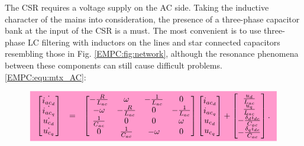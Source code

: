     The CSR requires a voltage supply on the AC side. Taking the inductive character of the mains into consideration, the presence of a three-phase capacitor bank at the input of the CSR is a must. The most convenient is to use three-phase LC filtering with inductors on the lines and star connected capacitors resembling those in Fig. \ref{EMPC:fig:network}, although the resonance phenomena between these components can still cause difficult problems.\\
     \ref{EMPC:equ:mtx_AC}:

    \begin{equation}
    \hlcmath{PT}{
        \begin{array}{rcl}
            \begin{bmatrix}
                \dot{i_{ac_d}}\\
                \dot{i_{ac_q}}\\
                \dot{u_{c_d}}\\
                \dot{u_{c_q}}
            \end{bmatrix}&=&
            \begin{bmatrix}
                -\frac{R}{L_{ac}}   &\omega &-\frac{1}{L_{ac}}  &0\\
                -\omega   &-\frac{R}{L_{ac}} &0  &-\frac{1}{L_{ac}}\\
                \frac{1}{C_{ac}}   &0 &0  &\omega\\
                0   &\frac{1}{C_{ac}} &-\omega  &0
            \end{bmatrix}
            \begin{bmatrix}
                i_{ac_d}\\
                i_{ac_q}\\
                u_{c_d}\\
                u_{c_q}
            \end{bmatrix}+
            \begin{bmatrix}
                \frac{u_d}{L_{ac}}\\
                \frac{u_q}{L_{ac}}\\
                -\frac{\delta_di_{dc}}{C_{ac}}\\
                -\frac{\delta_qi_{dc}}{C_{ac}}
            \end{bmatrix}\nonumber.
        \end{array}}
    \end{equation}

